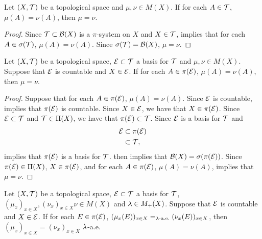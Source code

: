 \documentclass{book}
\begin{document}
	\begin{ex}  
		Let $(X, \mathcal{T})$ be a topological space and $\mu, \nu \in M(X)$. If for each $A \in \mathcal{T}$, $\mu(A) = \nu(A)$, then $\mu = \nu$.
	\end{ex}

	\begin{proof}
		Since $\mathcal{T} \subset \mathcal{B}(X)$ is a $\pi$-system on $X$  and $X \in \mathcal{T}$,  implies that for each $A \in \sigma(\mathcal{T})$, $\mu(A) = \nu(A)$. Since $\sigma(\mathcal{T}) = \mathcal{B}(X)$, $\mu = \nu$. 
	\end{proof}

	\begin{ex}  
		Let $(X, \mathcal{T})$ be a topological space, $\mathcal{E} \subset \mathcal{T}$ a basis for $\mathcal{T}$ and $\mu, \nu \in M(X)$. Suppose that $\mathcal{E}$ is countable and $X \in \mathcal{E}$. If for each $A \in \pi(\mathcal{E})$, $\mu(A) = \nu(A)$, then $\mu = \nu$. 
	\end{ex}
	
	\begin{proof}
		Suppose that for each $A \in \pi(\mathcal{E})$, $\mu(A) = \nu(A)$. Since $\mathcal{E}$ is countable,  implies that $\pi(\mathcal{E})$ is countable. Since $X \in \mathcal{E}$, we have that $X \in \pi(\mathcal{E})$. Since $\mathcal{E} \subset \mathcal{T}$ and $\mathcal{T} \in \Pi(X)$, we have that $\pi(\mathcal{E}) \subset \mathcal{T}$. Since $\mathcal{E}$ is a basis for $\mathcal{T}$ and 
		\begin{align*}
			\mathcal{E}
			& \subset \pi(\mathcal{E}) \\
			& \subset \mathcal{T},
		\end{align*}
		 implies that $\pi(\mathcal{E})$ is a basis for $\mathcal{T}$.  then implies that $\mathcal{B}(X) = \sigma(\pi(\mathcal{E}))$. Since $\pi(\mathcal{E}) \in \Pi(X)$, $X \in \pi(\mathcal{E})$, and for each $A \in \pi(\mathcal{E})$, $\mu(A) = \nu(A)$,  implies that $\mu = \nu$.
	\end{proof}
	
	\begin{ex}  
		Let $(X, \mathcal{T})$ be a topological space, $\mathcal{E} \subset \mathcal{T}$ a basis for $\mathcal{T}$, $(\mu_x)_{x \in X}, (\nu_x)_{x \in X} \nu \in M(X)$ and $\lambda \in M_+(X)$. Suppose that $\mathcal{E}$ is countable and $X \in \mathcal{E}$. If for each $E \in \pi(\mathcal{E})$, $(\mu_x(E))_{x \in X} =_{\text{$\lambda$-a.e.}} (\nu_x(E))_{x \in X}$, then $(\mu_x)_{x \in X} = (\nu_x)_{x \in X}$ $\lambda$-a.e. 
	\end{ex}
\end{document}
